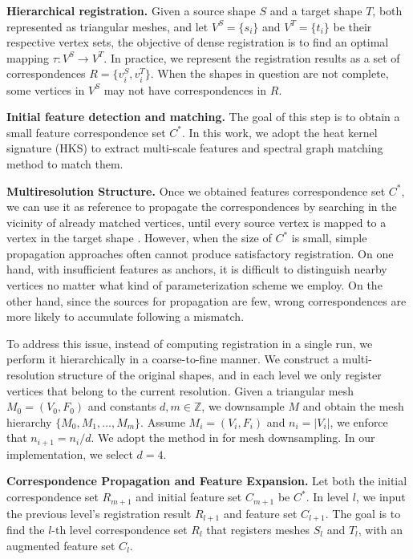 \textbf{Hierarchical registration.}
Given a source shape $S$ and a target shape $T$, both represented as triangular meshes, and let $V^S=\{s_i\}$ and $V^T=\{t_i\}$ be their respective vertex sets, the objective of dense registration is to find an optimal mapping $\tau: V^S \to V^T$. In practice, we represent the registration results as a set of correspondences $R=\{v^S_i, v^T_i\}$. When the shapes in question are not complete, some vertices in $V^S$ may not have correspondences in $R$.

\textbf{Initial feature detection and matching.}
The goal of this step is to obtain a small feature correspondence set $C^*$.
In this work, we adopt the heat kernel signature (HKS) \cite{Sun:2009:CGF}
to extract multi-scale features and spectral graph matching
method \cite{Leordeanu:2005a:ICCV} to match them.

\textbf{Multiresolution Structure.}
Once we obtained features correspondence set $C^*$, we can use it as reference to propagate the correspondences by searching in the vicinity of already matched vertices, until every source vertex is mapped to a vertex in the target shape \cite{Hou:2011:TVCG,Huang:2008:CGF}. However, when the size of $C^*$ is small, simple propagation approaches often cannot produce satisfactory registration. On one hand, with insufficient features as anchors, it is difficult to distinguish nearby vertices no matter what kind of parameterization scheme we employ. On the other hand, since the sources for propagation are few, wrong correspondences are more likely to accumulate following a mismatch.

To address this issue, instead of computing registration in a single run, we perform it hierarchically in a coarse-to-fine manner. We construct a multi-resolution structure of the original shapes, and in each level we only register vertices that belong to the current resolution. Given a triangular mesh $M_0=(V_0,F_0)$ and constants $d, m \in\mathbb{Z}$, we downsample $M$ and obtain the mesh hierarchy $\{M_0,M_1,\ldots,M_m\}$. Assume $M_i=(V_i,F_i)$ and $n_i = |V_i|$, we enforce that $n_{i+1}=n_i/d$. We adopt the method in \cite{Garland:1999} for mesh downsampling. In our implementation, we select $d=4$.

\textbf{Correspondence Propagation and Feature Expansion.}
Let both the initial correspondence set $R_{m+1}$ and initial feature set $C_{m+1}$ be $C^*$. In level $l$, we input the previous level's registration result $R_{l+1}$ and feature set $C_{l+1}$. The goal is to find the $l$-th level correspondence set $R_l$ that registers meshes $S_l$ and $T_l$, with an augmented feature set $C_l$.

